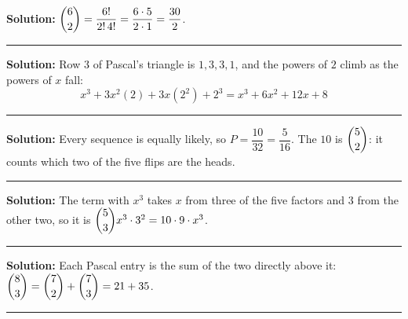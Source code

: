 \documentclass[12pt]{article}
\begin{document}




\textbf{Solution:} \quad $\dbinom{6}{2} = \dfrac{6!}{2!\,4!} = \dfrac{6 \cdot 5}{2 \cdot 1}
= \dfrac{30}{2}$. 

\vspace{0.15cm}\noindent\rule{\linewidth}{0.2pt}\vspace{0.15cm}


\textbf{Solution:} \quad Row $3$ of Pascal's triangle is $1, 3, 3, 1$, and the powers of $2$
climb as the powers of $x$ fall:
\[ x^3 + 3x^2(2) + 3x(2^2) + 2^3 = x^3 + 6x^2 + 12x + 8 \]

\vspace{0.15cm}\noindent\rule{\linewidth}{0.2pt}\vspace{0.15cm}


\textbf{Solution:} \quad Every sequence is equally likely, so
$P = \dfrac{10}{32} = \dfrac{5}{16}$. The $10$ is $\dbinom{5}{2}$: it counts which two of the
five flips are the heads. 

\vspace{0.15cm}\noindent\rule{\linewidth}{0.2pt}\vspace{0.15cm}


\textbf{Solution:} \quad The term with $x^3$ takes $x$ from three of the five factors and $3$
from the other two, so it is $\dbinom{5}{3}x^3 \cdot 3^2 = 10 \cdot 9 \cdot x^3$.

\vspace{0.15cm}\noindent\rule{\linewidth}{0.2pt}\vspace{0.15cm}


\textbf{Solution:} \quad Each Pascal entry is the sum of the two directly above it:
$\dbinom{8}{3} = \dbinom{7}{2} + \dbinom{7}{3} = 21 + 35$. 

\vspace{0.15cm}\noindent\rule{\linewidth}{0.2pt}\vspace{0.15cm}
\end{document}
